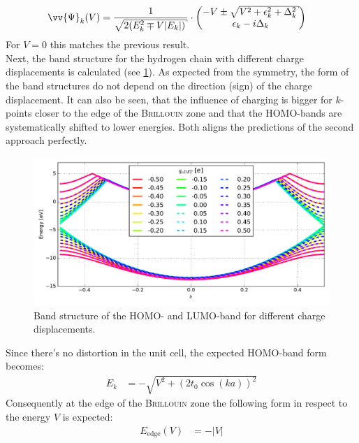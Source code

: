\begin{align}
\vv{\Psi}_k(V) &= \frac{1}{\sqrt{2\left(E_k^2\mp V|E_k|\right)}}\cdot \begin{pmatrix*}[c]
-V\pm \sqrt{V^2+\epsilon_k^2+\Delta_k^2}\\
\epsilon_k - i \Delta_k
\end{pmatrix*}
\end{align}
For $V=0$ this matches the previous result.\\
Next, the band structure for the hydrogen chain with different charge displacements is calculated (see \cref{image_hydrogen_charged_bands}). As expected from the symmetry, the form of the band structures do not depend on the direction (sign) of the charge displacement. It can also be seen, that the influence of charging is bigger for $k$-points closer to the edge of the \textsc{Brillouin} zone and that the HOMO-bands are systematically shifted to lower energies. Both aligns the predictions of the second approach perfectly.
\begin{figure}
	\centering
	\includegraphics[width = 13cm]{Images/Hydrogen/charging/band_structure_q_1}
	\caption{Band structure of the HOMO- and LUMO-band for different charge displacements.}
	\label{image_hydrogen_charged_bands}
\end{figure}
Since there's no distortion in the unit cell, the expected HOMO-band form becomes:
\begin{align}
E_k &= -\sqrt{V^2 + \left(2t_0\cos(ka)\right)^2}
\end{align}
Consequently at the edge of the \textsc{Brillouin} zone the following form in respect to the energy $V$ is expected:
\begin{align}
E_\text{edge}(V) &= -\left|V\right|
\end{align}
